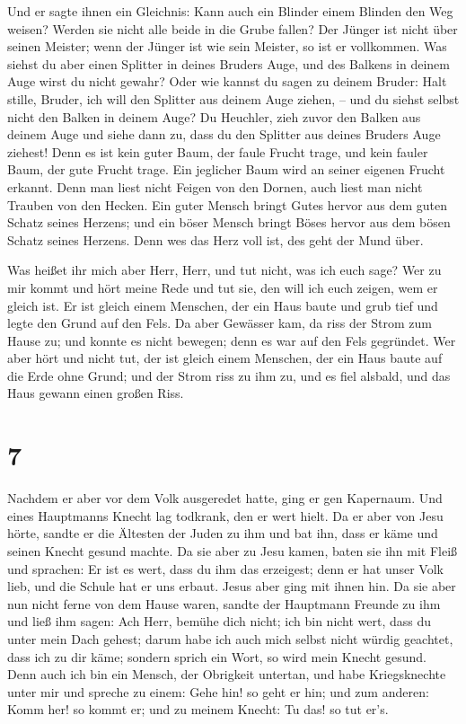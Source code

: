  Und er sagte ihnen ein Gleichnis: Kann auch ein Blinder
einem Blinden den Weg weisen? Werden sie nicht alle beide in die Grube
fallen?  Der Jünger ist nicht über seinen Meister; wenn
der Jünger ist wie sein Meister, so ist er vollkommen. 
Was siehst du aber einen Splitter in deines Bruders Auge, und des
Balkens in deinem Auge wirst du nicht gewahr?  Oder wie
kannst du sagen zu deinem Bruder: Halt stille, Bruder, ich will den
Splitter aus deinem Auge ziehen, -- und du siehst selbst nicht den
Balken in deinem Auge? Du Heuchler, zieh zuvor den Balken aus deinem
Auge und siehe dann zu, dass du den Splitter aus deines Bruders Auge
ziehest!  Denn es ist kein guter Baum, der faule Frucht
trage, und kein fauler Baum, der gute Frucht trage.  Ein
jeglicher Baum wird an seiner eigenen Frucht erkannt. Denn man liest
nicht Feigen von den Dornen, auch liest man nicht Trauben von den
Hecken.  Ein guter Mensch bringt Gutes hervor aus dem
guten Schatz seines Herzens; und ein böser Mensch bringt Böses hervor
aus dem bösen Schatz seines Herzens. Denn wes das Herz voll ist, des
geht der Mund über.

 Was heißet ihr mich aber Herr, Herr, und tut nicht, was
ich euch sage?  Wer zu mir kommt und hört meine Rede und
tut sie, den will ich euch zeigen, wem er gleich ist.  Er
ist gleich einem Menschen, der ein Haus baute und grub tief und legte
den Grund auf den Fels. Da aber Gewässer kam, da riss der Strom zum
Hause zu; und konnte es nicht bewegen; denn es war auf den Fels
gegründet.  Wer aber hört und nicht tut, der ist gleich
einem Menschen, der ein Haus baute auf die Erde ohne Grund; und der
Strom riss zu ihm zu, und es fiel alsbald, und das Haus gewann einen
großen Riss.

\hypertarget{section-6}{%
\section{7}\label{section-6}}

 Nachdem er aber vor dem Volk ausgeredet hatte, ging er
gen Kapernaum.  Und eines Hauptmanns Knecht lag todkrank,
den er wert hielt.  Da er aber von Jesu hörte, sandte er
die Ältesten der Juden zu ihm und bat ihn, dass er käme und seinen
Knecht gesund machte.  Da sie aber zu Jesu kamen, baten
sie ihn mit Fleiß und sprachen: Er ist es wert, dass du ihm das
erzeigest;  denn er hat unser Volk lieb, und die Schule
hat er uns erbaut.  Jesus aber ging mit ihnen hin. Da sie
aber nun nicht ferne von dem Hause waren, sandte der Hauptmann Freunde
zu ihm und ließ ihm sagen: Ach Herr, bemühe dich nicht; ich bin nicht
wert, dass du unter mein Dach gehest;  darum habe ich auch
mich selbst nicht würdig geachtet, dass ich zu dir käme; sondern sprich
ein Wort, so wird mein Knecht gesund.  Denn auch ich bin
ein Mensch, der Obrigkeit untertan, und habe Kriegsknechte unter mir und
spreche zu einem: Gehe hin! so geht er hin; und zum anderen: Komm her!
so kommt er; und zu meinem Knecht: Tu das! so tut er's.

